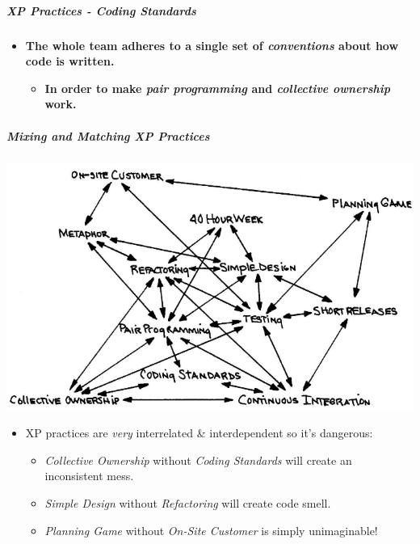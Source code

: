 \documentclass[a4paper]{article}
\providecommand{\tightlist}{%
  \setlength{\itemsep}{0pt}\setlength{\parskip}{0pt}}
\let\oldsubparagraph\subparagraph
\renewcommand{\subparagraph}[1]{\oldsubparagraph{#1}\mbox{}}
\begin{document}
\hypertarget{xp-practices---coding-standards}{%
\subparagraph{XP Practices - Coding
Standards}\label{xp-practices---coding-standards}}

\begin{itemize}
\tightlist
\item
  \textbf{The whole team adheres to a single set of \emph{conventions}
  about how code is written.}

  \begin{itemize}
  \tightlist
  \item
    \textbf{In order to make \emph{pair programming} and
    \emph{collective ownership} work.}
  \end{itemize}
\end{itemize}

\hypertarget{mixing-and-matching-xp-practices}{%
\subparagraph{Mixing and Matching XP
Practices}\label{mixing-and-matching-xp-practices}}

\includegraphics{2C-SE.assets/1543148331734.png}

\begin{itemize}
\tightlist
\item
  XP practices are \emph{very} interrelated \& interdependent so it's
  dangerous:

  \begin{itemize}
  \tightlist
  \item
    \emph{Collective Ownership} without \emph{Coding Standards} will
    create an inconsistent mess.
  \item
    \emph{Simple Design} without \emph{Refactoring} will create code
    smell.
  \item
    \emph{Planning Game} without \emph{On-Site Customer} is simply
    unimaginable!
  \end{itemize}
\end{itemize}
\end{document}
